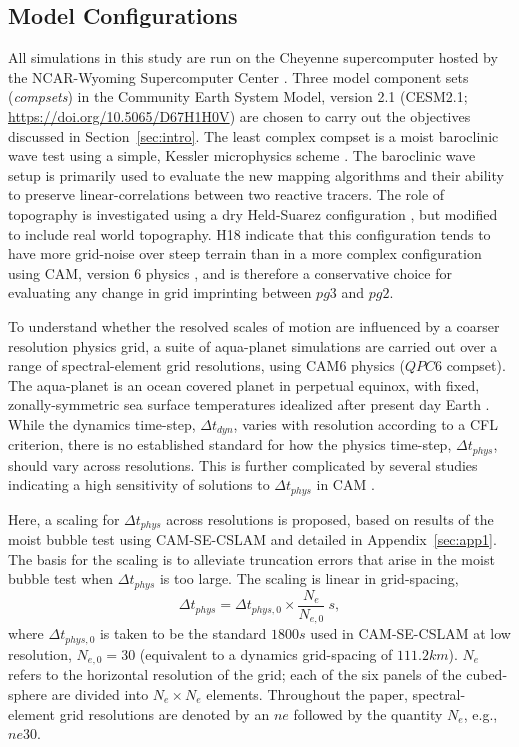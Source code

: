 \documentclass{agujournal}
\begin{document}


\subsection{Model Configurations}\label{sec:config}

All simulations in this study are run on the Cheyenne supercomputer hosted by the NCAR-Wyoming Supercomputer Center \citep{AMPproj}. Three model component sets ({\em{compsets}}) in the Community Earth System Model, version 2.1 (CESM2.1; \url{https://doi.org/10.5065/D67H1H0V}) are chosen to carry out the objectives discussed in Section~\ref{sec:intro}. The least complex compset is a moist baroclinic wave test using a simple, Kessler microphysics scheme \citep[$FKESSLER$ compset;][]{LetAl2018JAMES}. The baroclinic wave setup is primarily used to evaluate the new mapping algorithms and their ability to preserve linear-correlations between two reactive tracers. The role of topography is investigated using a dry Held-Suarez configuration \citep[$FHS94$ compset;][]{HS1994}, but modified to include real world topography. H18 indicate that this configuration tends to have more grid-noise over steep terrain than in a more complex configuration using CAM, version 6 physics \citep[CAM6;][]{}, and is therefore a conservative choice for evaluating any change in grid imprinting between $pg3$ and $pg2$. 

To understand whether the resolved scales of motion are influenced by a coarser resolution physics grid, a suite of aqua-planet simulations \citep{NH2000ASL,MWO2016JAMES} are carried out over a range of spectral-element grid resolutions, using CAM6 physics ($QPC6$ compset). The aqua-planet is an ocean covered planet in perpetual equinox, with fixed, zonally-symmetric sea surface temperatures idealized after present day Earth \citep[$QOBS$ in][]{NH2000ASL}. While the dynamics time-step, $\Delta t_{dyn}$, varies with resolution according to a CFL criterion, there is no established standard for how the physics time-step, $\Delta t_{phys}$, should vary across resolutions. This is further complicated by several studies indicating a high sensitivity of solutions to $\Delta t_{phys}$ in CAM  \citep{WO2003QJR,W2013QJRMS,WETAL2015JAMES,HR2018JAMES}.

Here, a scaling for $\Delta t_{phys}$ across resolutions is proposed, based on results of the moist bubble test \citep{HR2018JAMES} using CAM-SE-CSLAM and detailed in Appendix~\ref{sec:app1}. The basis for the scaling is to alleviate truncation errors that arise in the moist bubble test when $\Delta t_{phys}$ is too large. The scaling is linear in grid-spacing,
\begin{equation}
\Delta t_{phys} = \Delta t_{phys,0} \times \frac{N_e}{N_{e,0}}~s,\label{eq:dt-scale}
\end{equation}
where $\Delta t_{phys,0}$ is taken to be the standard $1800 s$ used in CAM-SE-CSLAM at low resolution, $N_{e,0} = 30$ (equivalent to a dynamics grid-spacing of $111.2km$). $N_e$ refers to the horizontal resolution of the grid; each of the six panels of the cubed-sphere are divided into $N_e \times N_e$ elements. Throughout the paper, spectral-element grid resolutions are denoted by an $ne$ followed by the quantity $N_e$, e.g., $ne30$.
\end{document}
